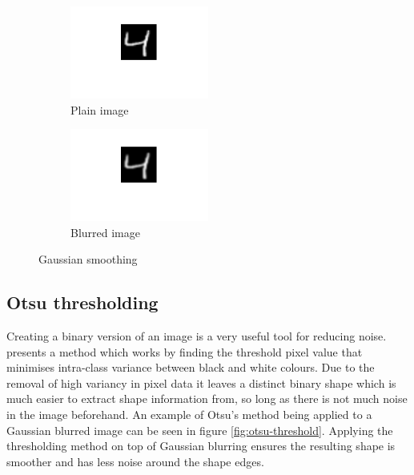 \documentclass[12pt]{article}
\begin{document}
    \begin{figure}[H]
      \begin{subfigure}{.5\textwidth}
        \centering
        \includegraphics[width=0.5\textwidth]{scaled}
        \caption{Plain image}
        \label{fig:scaled}
      \end{subfigure}
      \begin{subfigure}{.5\textwidth}
        \centering
        \includegraphics[width=0.5\textwidth]{blurred}
        \caption{Blurred image}
        \label{fig:blurred}
      \end{subfigure}
      \caption{Gaussian smoothing}
      \label{fig:gauss-filter}
    \end{figure}

  \subsection{Otsu thresholding} \label{otsu-thres}
    Creating a binary version of an image is a very useful tool for reducing noise. \cite{otsu1979threshold} presents a method which works by finding the threshold pixel value that minimises intra-class variance between black and white colours. Due to the removal of high variancy in pixel data it leaves a distinct binary shape which is much easier to extract shape information from, so long as there is not much noise in the image beforehand. An example of Otsu's method being applied to a Gaussian blurred image can be seen in figure \ref{fig:otsu-threshold}. Applying the thresholding method on top of Gaussian blurring ensures the resulting shape is smoother and has less noise around the shape edges.
\end{document}

